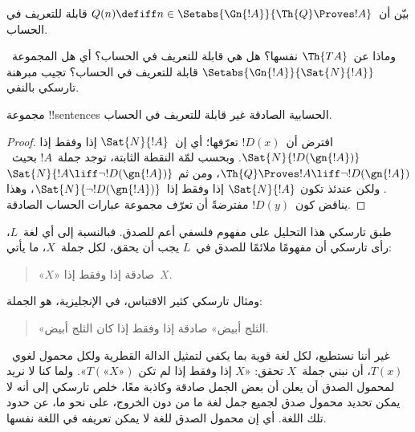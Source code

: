 \documentclass[../../../include/open-logic-section]{subfiles}
\begin{document}
\begin{prob}
بيّن أن~$Q(n) \defiff n \in \Setabs{\Gn{!A}}{\Th{Q} \Proves !A}$
قابلة للتعريف في الحساب.
\end{prob}

وماذا عن~$\Th{TA}$ نفسها؟ هل هي قابلة للتعريف في الحساب؟ أي هل
المجموعة~$\Setabs{\Gn{!A}}{\Sat{N}{!A}}$ قابلة للتعريف في الحساب؟
تجيب مبرهنة تارسكي بالنفي.

\begin{thm}
مجموعة !!{sentence}s الحسابية الصادقة غير قابلة للتعريف في الحساب.
\end{thm}

\begin{proof}
افترض أن~$!D(x)$ تعرّفها؛ أي إن~$\Sat{N}{!A}$ إذا وفقط إذا
$\Sat{N}{!D(\gn{!A})}$. وبحسب لمّة النقطة الثابتة، توجد جملة~$!A$
بحيث~$\Th{Q} \Proves !A \liff \lnot !D(\gn{!A})$، ومن ثم
$\Sat{N}{!A \liff \lnot !D(\gn{!A})}$. ولكن عندئذ تكون
$\Sat{N}{!A}$ إذا وفقط إذا~$\Sat{N}{\lnot !D(\gn{!A})}$، وهذا يناقض
كون~$!D(y)$ مفترضةً أن تعرّف مجموعة عبارات الحساب الصادقة.
\end{proof}

طبق تارسكي هذا التحليل على مفهوم فلسفي أعم للصدق. فبالنسبة إلى أي
لغة~$L$، رأى تارسكي أن مفهومًا ملائمًا للصدق في~$L$ يجب أن يحقق، لكل
جملة~$X$، ما يأتي:
\begin{quote}
«$X$» صادقة إذا وفقط إذا~$X$.
\end{quote}
ومثال تارسكي كثير الاقتباس، في الإنجليزية، هو الجملة:
\begin{quote}
«الثلج أبيض» صادقة إذا وفقط إذا كان الثلج أبيض.
\end{quote}
غير أننا نستطيع، لكل لغة قوية بما يكفي لتمثيل الدالة القطرية ولكل
محمول لغوي~$T(x)$، أن نبني جملة~$X$ تحقق: «$X$ إذا وفقط إذا لم تكن
$T(\text{«$X$»})$». ولما كنا لا نريد لمحمول الصدق أن يعلن أن بعض
الجمل صادقة وكاذبة معًا، خلص تارسكي إلى أنه لا يمكن تحديد محمول صدق
لجميع جمل لغة ما من دون الخروج، على نحو ما، عن حدود تلك اللغة. أي إن
محمول الصدق للغة لا يمكن تعريفه في اللغة نفسها.
\end{document}
